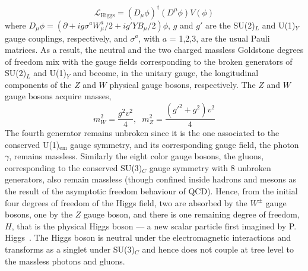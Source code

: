 \begin{equation}
    \mathcal{L}_\text{Higgs} = (D_\mu\phi)^\dagger(D^\mu\phi) V(\phi)
\end{equation}
where $D_\mu\phi=(\partial + ig\sigma^aW^a_\mu/2 + ig'YB_\mu/2)\phi$, $g$ and $g'$ are the SU(2)$_L$ and U(1)$_Y$ gauge couplings, respectively, and $\sigma^a$, with $a$ = 1,2,3, are the usual Pauli matrices. As a result, the neutral and the two charged massless Goldstone degrees of freedom mix with the gauge fields corresponding to the broken generators of SU(2)$_L$ and U(1)$_Y$ and become, in the unitary gauge, the longitudinal components of the $Z$ and $W$ physical gauge bosons, respectively. The $Z$ and $W$ gauge bosons acquire masses,
\begin{equation}
    m_W^2 = \frac{g^2v^2}{4}, \hspace{7pt} m_Z^2 = \frac{(g'^2+g^2)v^2}{4}
\end{equation}
The fourth generator remains unbroken since it is the one associated to the conserved U(1)$_\text{em}$ gauge symmetry, and its corresponding gauge field, the photon $\gamma$, remains massless. Similarly the eight color gauge bosons, the gluons, corresponding to the conserved SU(3)$_C$ gauge symmetry with 8 unbroken generators, also remain massless (though confined inside hadrons and mesons as the result of the asymptotic freedom behaviour of QCD). Hence, from the initial four degrees of freedom of the Higgs field, two are absorbed by the $W^\pm$ gauge bosons, one by the $Z$ gauge boson, and there is one remaining degree of freedom, $H$, that is the physical Higgs boson — a new scalar particle first imagined by P. Higgs~\cite{PhysRevLett.13.321,PhysRev.145.1156}. The Higgs boson is neutral under the electromagnetic interactions and transforms as a singlet under SU(3)$_C$ and hence does not couple at tree level to the massless photons and gluons.


